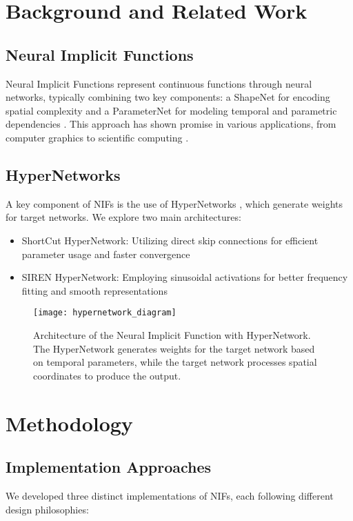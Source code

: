 \documentclass[10pt,journal,compsoc]{IEEEtran}
\begin{document}
\section{Background and Related Work}
\subsection{Neural Implicit Functions}
Neural Implicit Functions represent continuous functions through neural networks, typically combining two key components: a ShapeNet for encoding spatial complexity and a ParameterNet for modeling temporal and parametric dependencies \cite{nif2023}. This approach has shown promise in various applications, from computer graphics to scientific computing \cite{neural_fields2022}.

\subsection{HyperNetworks}
A key component of NIFs is the use of HyperNetworks \cite{hypernetworks2016}, which generate weights for target networks. We explore two main architectures:
\begin{itemize}
    \item ShortCut HyperNetwork: Utilizing direct skip connections for efficient parameter usage and faster convergence
    \item SIREN HyperNetwork: Employing sinusoidal activations for better frequency fitting and smooth representations \cite{siren2020}
\end{itemize}

\begin{figure}[t]
    \centering
    \texttt{[image: hypernetwork\_diagram]}
    \caption{Architecture of the Neural Implicit Function with HyperNetwork. The HyperNetwork generates weights for the target network based on temporal parameters, while the target network processes spatial coordinates to produce the output.}
    \label{fig:architecture}
\end{figure}

\section{Methodology}
\subsection{Implementation Approaches}
We developed three distinct implementations of NIFs, each following different design philosophies:
\end{document}
